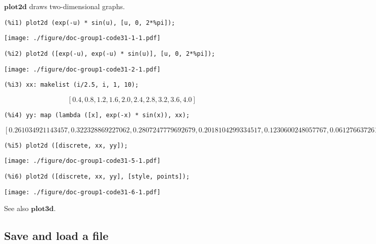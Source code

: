 \documentclass[12pt,leqno]{article}
\begin{document}
$\mathbf{plot2d}$ draws two-dimensional graphs.
\begin{verbatim}
(%i1) plot2d (exp(-u) * sin(u), [u, 0, 2*%pi]);
\end{verbatim}
\texttt{[image: ./figure/doc-group1-code31-1-1.pdf]}
\begin{verbatim}
(%i2) plot2d ([exp(-u), exp(-u) * sin(u)], [u, 0, 2*%pi]);
\end{verbatim}
\texttt{[image: ./figure/doc-group1-code31-2-1.pdf]}
\begin{verbatim}
(%i3) xx: makelist (i/2.5, i, 1, 10);
\end{verbatim}
\begin{equation}
\left[ 0.4 , 0.8 , 1.2 , 1.6 , 2.0 , 2.4 , 2.8 , 3.2 , 3.6 , 4.0 \right] \tag{\%o3}
\label{eq:doc-group1-code31-3-1}
\end{equation}
\begin{verbatim}
(%i4) yy: map (lambda ([x], exp(-x) * sin(x)), xx);
\end{verbatim}
\begin{equation}
\left[ 0.261034921143457 , 0.322328869227062 , 0.2807247779692679 , 0.2018104299334517 , 0.1230600248057767 , 0.06127663726195732 , 0.02037065038968651 , -0.002379458741457425 , -0.01209130576984141 , -0.01386132121415296 \right] \tag{\%o4}
\label{eq:doc-group1-code31-4-1}
\end{equation}
\begin{verbatim}
(%i5) plot2d ([discrete, xx, yy]);
\end{verbatim}
\texttt{[image: ./figure/doc-group1-code31-5-1.pdf]}
\begin{verbatim}
(%i6) plot2d ([discrete, xx, yy], [style, points]);
\end{verbatim}
\texttt{[image: ./figure/doc-group1-code31-6-1.pdf]}


See also $\mathbf{plot3d}$.

\subsection{Save and load a file}
\end{document}
